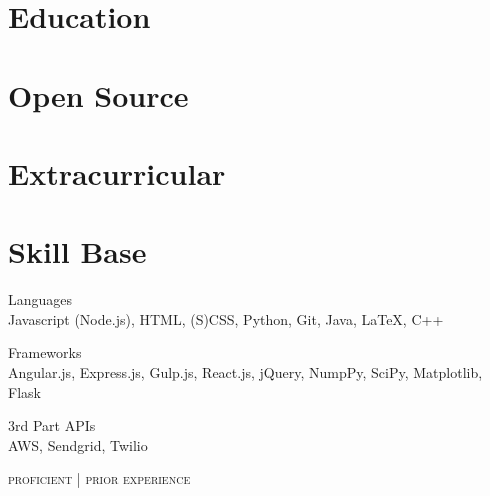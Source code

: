 \documentclass{article}
\begin{document}
\begin{minipage}[t]{0.35\textwidth}
  \vspace{0pt}

  \section{Education}

    

    

  \section{Open Source}

    

  \section{Extracurricular}

    

    

  \section{Skill Base}
  {\raggedright
    Languages \\
    {\small
      {\color{highlight}
        Javascript (Node.js), HTML, (S)CSS, Python, Git,
      }
      Java, LaTeX, C++
    }
    \vspace{5pt}

    Frameworks \\
    {\small
      {\color{highlight}
        Angular.js, Express.js, Gulp.js, React.js,
      }
      jQuery, NumpPy, SciPy, Matplotlib, Flask \\
    }

    \vspace{5pt}

    3rd Part APIs \\
    {\small
      {\color{highlight}
        AWS,
      }
      Sendgrid, Twilio
    }

    \hfill\textsc{\footnotesize{{\color{highlight} proficient} | prior experience}}
  }
\end{minipage}
\end{document}
